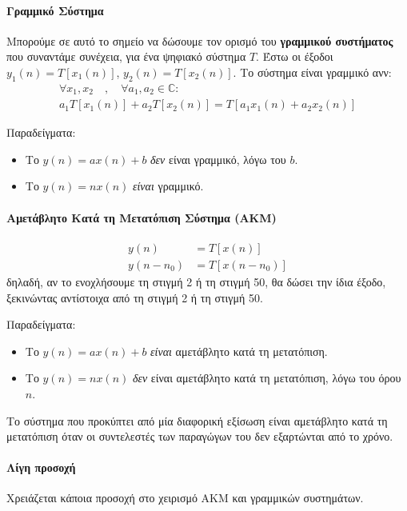 \documentclass[11pt,a4paper,notitlepage,fleqn]{article}
\begin{document}
\paragraph{Γραμμικό Σύστημα}
Μπορούμε σε αυτό το σημείο να δώσουμε τον ορισμό του \textbf{γραμμικού συστήματος} που συναντάμε συνέχεια,
για ένα ψηφιακό σύστημα \( T \). Έστω οι έξοδοι \( y_1(n) = T\left[x_1(n)\right] \),
\( y_2(n) = T\left[x_2(n)\right] \). Το σύστημα είναι γραμμικό ανν:
\begin{gather*}
\forall x_1,x_2\quad,\quad \forall a_1,a_2\in\mathbb C:\\
a_1T\left[x_1(n)\right]+a_2T\left[x_2(n)\right] = T\left[a_1x_1(n)+a_2x_2(n)\right]
\end{gather*}

Παραδείγματα:
\begin{itemize}
	\item Το \( y(n) = ax(n) + b \) \textit{δεν} είναι γραμμικό, λόγω του \( b \).
	\item Το \( y(n) = nx(n) \) \textit{είναι} γραμμικό.
\end{itemize}

\paragraph{Αμετάβλητο Κατά τη Μετατόπιση Σύστημα (ΑΚΜ)}
\begin{align*}
	y(n) &= T\left[x(n)\right] \\
	y(n-n_0) &= T\left[x(n-n_0)\right]
\end{align*}
δηλαδή, αν το ενοχλήσουμε τη στιγμή 2 ή τη στιγμή 50, θα δώσει την ίδια έξοδο, ξεκινώντας αντίστοιχα
από τη στιγμή 2 ή τη στιγμή 50.

Παραδείγματα:
\begin{itemize}
	\item Το \( y(n) = ax(n) + b \) \textit{είναι} αμετάβλητο κατά τη μετατόπιση.
	\item Το \( y(n) = nx(n) \) \textit{δεν} είναι αμετάβλητο κατά τη μετατόπιση, λόγω του όρου \( n \).
\end{itemize}

Το σύστημα που προκύπτει από μία διαφορική εξίσωση είναι αμετάβλητο κατά τη μετατόπιση όταν οι συντελεστές των παραγώγων του δεν εξαρτώνται από το χρόνο.

\paragraph{Λίγη προσοχή}
Χρειάζεται κάποια προσοχή στο χειρισμό ΑΚΜ και γραμμικών συστημάτων.
\end{document}
